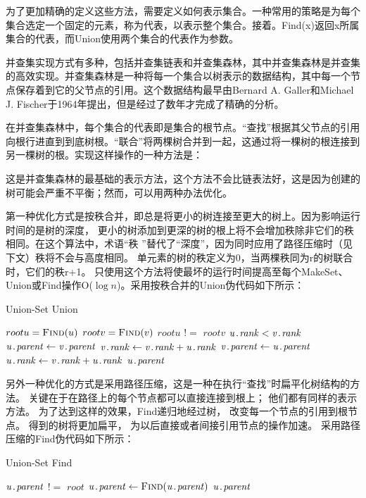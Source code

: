为了更加精确的定义这些方法，需要定义如何表示集合。一种常用的策略是为每个集合选定一个固定的元素，称为代表，以表示整个集合。接着。Find(x)返回x所属集合的代表，而Union使用两个集合的代表作为参数。


并查集实现方式有多种，包括并查集链表和并查集森林，其中并查集森林是并查集的高效实现。并查集森林是一种将每一个集合以树表示的数据结构，其中每一个节点保存着到它的父节点的引用。这个数据结构最早由Bernard A. Galler和Michael J. Fischer于1964年提出，但是经过了数年才完成了精确的分析。

在并查集森林中，每个集合的代表即是集合的根节点。“查找”根据其父节点的引用向根行进直到到底树根。“联合”将两棵树合并到一起，这通过将一棵树的根连接到另一棵树的根。实现这样操作的一种方法是：

这是并查集森林的最基础的表示方法，这个方法不会比链表法好，这是因为创建的树可能会严重不平衡；然而，可以用两种办法优化。

第一种优化方式是按秩合并，即总是将更小的树连接至更大的树上。因为影响运行时间的是树的深度，
更小的树添加到更深的树的根上将不会增加秩除非它们的秩相同。在这个算法中，术语“秩
”替代了“深度”，因为同时应用了路径压缩时（见下文）秩将不会与高度相同。
单元素的树的秩定义为0，当两棵秩同为r的树联合时，它们的秩r+1。
只使用这个方法将使最坏的运行时间提高至每个MakeSet、
Union或Find操作O($\log n$)。采用按秩合并的Union伪代码如下所示：
\begin{algorithm} 
	\caption {Union-Set Union} 
	\begin{codebox}
\li			$rootu = \textnormal{\scshape Find}(u)$
\li			$rootv = \textnormal{\scshape Find}(v)$
\li			\If	$rootu$ $!=$ $rootv$
\li				\Then
					\If $\attribii{u}{rank} < \attribii{v}{rank}$
\li						\Then
							$\attribii{u}{parent} \leftarrow \attribii{v}{parent}$
\li							$\attribii{v}{rank} \leftarrow \attribii{v}{rank} + \attribii{u}{rank}$
\li						\Else
\li							$\attribii{v}{parent} \leftarrow \attribii{u}{parent}$
\li							$\attribii{u}{rank} \leftarrow  \attribii{v}{rank} + \attribii{u}{rank}$
						\End
				\End
\li			\Return	$\attribii{u}{parent}$
	\end{codebox}
\end{algorithm} 

另外一种优化的方式是采用路径压缩，这是一种在执行“查找”时扁平化树结构的方法。
关键在于在路径上的每个节点都可以直接连接到根上；
他们都有同样的表示方法。
为了达到这样的效果，Find递归地经过树，
改变每一个节点的引用到根节点。
得到的树将更加扁平，
为以后直接或者间接引用节点的操作加速。
采用路径压缩的Find伪代码如下所示：
\begin{algorithm} 
	\caption {Union-Set Find} 
	\begin{codebox}
		\Procname{$\proc{Find}(u)$}
\li			\If $\attribii{u}{parent}$ $!=$ $root$
\li			\Then	$\attribii{u}{parent} \leftarrow \proc{Find}(\attribii{u}{parent})$ \End
\li			\Return	$\attribii{u}{parent}$
	\end{codebox}
\end{algorithm} 

